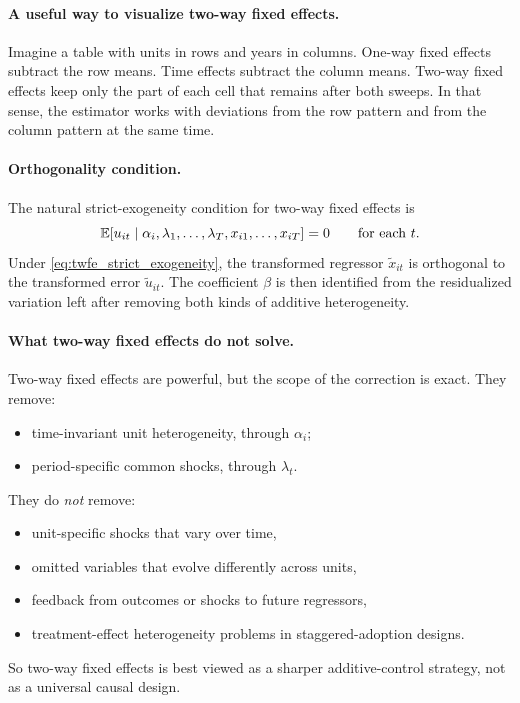 \paragraph{A useful way to visualize two-way fixed effects.}
Imagine a table with units in rows and years in columns. One-way fixed effects subtract the row means. Time effects subtract the column means. Two-way fixed effects keep only the part of each cell that remains after both sweeps. In that sense, the estimator works with deviations from the row pattern and from the column pattern at the same time.

\paragraph{Orthogonality condition.}
The natural strict-exogeneity condition for two-way fixed effects is
\begin{equation}
\mathbb{E}[u_{it}\mid \alpha_i,\lambda_1,\ldots,\lambda_T,x_{i1},\ldots,x_{iT}] = 0
\qquad \text{for each } t.
\label{eq:twfe_strict_exogeneity}
\end{equation}
Under \eqref{eq:twfe_strict_exogeneity}, the transformed regressor $\tilde{x}_{it}$ is orthogonal to the transformed error $\tilde{u}_{it}$. The coefficient $\beta$ is then identified from the residualized variation left after removing both kinds of additive heterogeneity.

\paragraph{What two-way fixed effects do not solve.}
Two-way fixed effects are powerful, but the scope of the correction is exact. They remove:
\begin{itemize}
\item time-invariant unit heterogeneity, through $\alpha_i$;
\item period-specific common shocks, through $\lambda_t$.
\end{itemize}
They do \emph{not} remove:
\begin{itemize}
\item unit-specific shocks that vary over time,
\item omitted variables that evolve differently across units,
\item feedback from outcomes or shocks to future regressors,
\item treatment-effect heterogeneity problems in staggered-adoption designs.
\end{itemize}
So two-way fixed effects is best viewed as a sharper additive-control strategy, not as a universal causal design.

